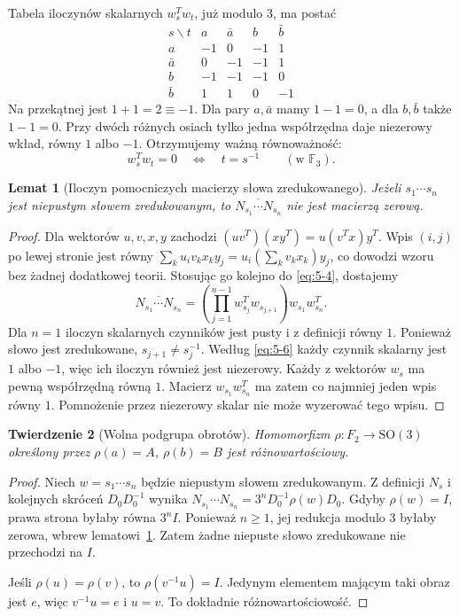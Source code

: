 \documentclass[11pt,a4paper]{article}
\numberwithin{equation}{section}
\theoremstyle{plain}
\newtheorem{twierdzenie}{Twierdzenie}[section]
\newtheorem{lemat}[twierdzenie]{Lemat}
\theoremstyle{definition}
\theoremstyle{remark}
\newcommand{\F}{\mathbb F}
\begin{document}
Tabela iloczynów skalarnych $w_s^Tw_t$, już modulo $3$, ma postać
\begin{equation}\label{eq:5-5}
\begin{array}{c|rrrr}
 s\backslash t&a&\bar a&b&\bar b\\\hline
 a&-1&0&-1&1\\
 \bar a&0&-1&-1&1\\
 b&-1&-1&-1&0\\
 \bar b&1&1&0&-1
\end{array}
\end{equation}
Na przekątnej jest $1+1=2\equiv-1$. Dla pary $a,\bar a$ mamy $1-1=0$, a dla $b,\bar b$ także $1-1=0$. Przy dwóch różnych osiach tylko jedna współrzędna daje niezerowy wkład, równy $1$ albo $-1$. Otrzymujemy ważną równoważność:
\begin{equation}\label{eq:5-6}
 w_s^Tw_t=0\quad\Longleftrightarrow\quad t=s^{-1} \qquad(\text{w }\F_3).
\end{equation}
\begin{lemat}[Iloczyn pomocniczych macierzy słowa zredukowanego]\label{lem:liczniki}
Jeżeli $s_1\cdots s_n$ jest niepustym słowem zredukowanym, to $\overline{N_{s_1}\cdots N_{s_n}}$ nie jest macierzą zerową.
\end{lemat}
\begin{proof}
Dla wektorów $u,v,x,y$ zachodzi $(uv^T)(xy^T)=u(v^Tx)y^T$. Wpis $(i,j)$ po lewej stronie jest równy $\sum_k u_iv_kx_ky_j=u_i(\sum_kv_kx_k)y_j$, co dowodzi wzoru bez żadnej dodatkowej teorii. Stosując go kolejno do \eqref{eq:5-4}, dostajemy
\begin{equation}\label{eq:5-7}
 \overline{N_{s_1}\cdots N_{s_n}}=
 \left(\prod_{j=1}^{n-1}w_{s_j}^Tw_{s_{j+1}}\right)w_{s_1}w_{s_n}^T.
\end{equation}
Dla $n=1$ iloczyn skalarnych czynników jest pusty i z definicji równy $1$. Ponieważ słowo jest zredukowane, $s_{j+1}\ne s_j^{-1}$. Według \eqref{eq:5-6} każdy czynnik skalarny jest $1$ albo $-1$, więc ich iloczyn również jest niezerowy. Każdy z wektorów $w_s$ ma pewną współrzędną równą $1$. Macierz $w_{s_1}w_{s_n}^T$ ma zatem co najmniej jeden wpis równy $1$. Pomnożenie przez niezerowy skalar nie może wyzerować tego wpisu.
\end{proof}
\begin{twierdzenie}[Wolna podgrupa obrotów]\label{tw:wolne-obroty}
Homomorfizm $\rho:F_2\to\mathrm{SO}(3)$ określony przez $\rho(a)=A$, $\rho(b)=B$ jest różnowartościowy.
\end{twierdzenie}
\begin{proof}
Niech $w=s_1\cdots s_n$ będzie niepustym słowem zredukowanym. Z definicji $N_s$ i kolejnych skróceń $D_0D_0^{-1}$ wynika $N_{s_1}\cdots N_{s_n}=3^nD_0^{-1}\rho(w)D_0$. Gdyby $\rho(w)=I$, prawa strona byłaby równa $3^nI$. Ponieważ $n\ge1$, jej redukcja modulo $3$ byłaby zerowa, wbrew lematowi~\ref{lem:liczniki}. Zatem żadne niepuste słowo zredukowane nie przechodzi na $I$.

Jeśli $\rho(u)=\rho(v)$, to $\rho(v^{-1}u)=I$. Jedynym elementem mającym taki obraz jest $e$, więc $v^{-1}u=e$ i $u=v$. To dokładnie różnowartościowość.
\end{proof}
\end{document}
